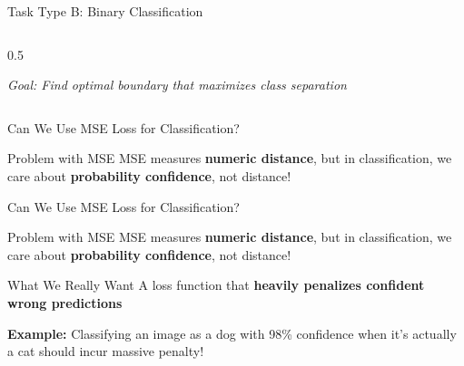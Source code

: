 \begin{frame}{Task Type B: Binary Classification}
\begin{columns}[c]
\begin{column}{0.5\textwidth}

            
            \vspace{0.5em}
            \small \textit{Goal: Find optimal boundary that maximizes class separation}
        \end{column}
    \end{columns}
\end{frame}



\begin{frame}{Can We Use MSE Loss for Classification?}
    \begin{alertblock}{Problem with MSE}
        MSE measures \textbf{numeric distance}, but in classification, we care about \textbf{probability confidence}, not distance!
    \end{alertblock}

\end{frame}

\begin{frame}{Can We Use MSE Loss for Classification?}
    \begin{alertblock}{Problem with MSE}
        MSE measures \textbf{numeric distance}, but in classification, we care about \textbf{probability confidence}, not distance!
    \end{alertblock}
    
    \vspace{1em}
    
    \begin{alertblock}{What We Really Want}
        A loss function that \textbf{heavily penalizes confident wrong predictions}
        
        \vspace{0.5em}
        \textbf{Example:} Classifying an image as a dog with 98\% confidence when it's actually a cat should incur massive penalty!
    \end{alertblock}
\end{frame}

